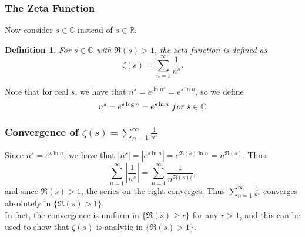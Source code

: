 \documentclass{article}
\newtheorem{definition}{Definition}[section]
\begin{document}
\subsubsection{The Zeta Function}
Now consider $s \in \mathbb{C}$ instead of $s \in \mathbb{R}$.
\begin{definition}
For $s \in \mathbb{C}$ with $\Re (s) > 1$, the zeta function is defined as 
\begin{equation*}
\zeta (s) = \sum_{n=1}^{\infty} \frac{1}{n^s}.
\end{equation*}
\end{definition}
Note that for real $s$, we have that $n^s = e^{\ln n^s} = e^{s \ln n}$, so we define
\begin{equation*}
n^s = e^{s \log n} = e^{s \ln n} \hspace{0.1cm} for \hspace{0.1cm} s \in \mathbb{C}
\end{equation*}

\subsubsection{Convergence of $\zeta (s) = \sum_{n=1}^{\infty} \frac{1}{n^s}$}
Since $n^s = e^{s \ln n}$, we have that $\left|n^s\right| = \left| e^{s \ln n} \right| = e^{\Re (s) \ln n} = n^{\Re (s)}$. Thus
\begin{equation*}
\sum_{n=1}^{\infty} \left| \frac{1}{n^s}\right| = \sum_{n=1}^{\infty} \frac{1}{n^{\Re (s)(}},
\end{equation*}
and since $\Re (s) > 1$, the series on the right converges. Thus $\sum_{n=1}^{\infty} \frac{1}{n^s}$ converges absolutely in $\{ \Re (s) > 1 \}$. \\
In fact, the convergence is uniform in $\{ \Re (s) \geq r \}$ for any $r > 1$, and this can be used to show that $\zeta (s)$ is analytic in $\{ \Re (s) > 1 \}$.
\end{document}
